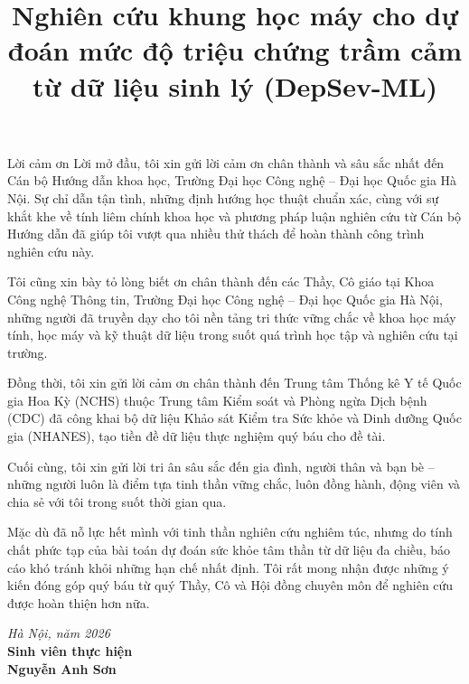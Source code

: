 \documentclass{uetgraduation}
\begin{document}
\title{Nghiên cứu khung học máy cho dự đoán mức độ triệu chứng trầm cảm từ dữ liệu sinh lý (DepSev-ML)}

\makecovers

\pagestyle{plain}

\begin{preamble}{Lời cảm ơn}
Lời mở đầu, tôi xin gửi lời cảm ơn chân thành và sâu sắc nhất đến Cán bộ Hướng dẫn khoa học, Trường Đại học Công nghệ -- Đại học Quốc gia Hà Nội. Sự chỉ dẫn tận tình, những định hướng học thuật chuẩn xác, cùng với sự khắt khe về tính liêm chính khoa học và phương pháp luận nghiên cứu từ Cán bộ Hướng dẫn đã giúp tôi vượt qua nhiều thử thách để hoàn thành công trình nghiên cứu này.

Tôi cũng xin bày tỏ lòng biết ơn chân thành đến các Thầy, Cô giáo tại Khoa Công nghệ Thông tin, Trường Đại học Công nghệ -- Đại học Quốc gia Hà Nội, những người đã truyền dạy cho tôi nền tảng tri thức vững chắc về khoa học máy tính, học máy và kỹ thuật dữ liệu trong suốt quá trình học tập và nghiên cứu tại trường.

Đồng thời, tôi xin gửi lời cảm ơn chân thành đến Trung tâm Thống kê Y tế Quốc gia Hoa Kỳ (NCHS) thuộc Trung tâm Kiểm soát và Phòng ngừa Dịch bệnh (CDC) đã công khai bộ dữ liệu Khảo sát Kiểm tra Sức khỏe và Dinh dưỡng Quốc gia (NHANES), tạo tiền đề dữ liệu thực nghiệm quý báu cho đề tài.

Cuối cùng, tôi xin gửi lời tri ân sâu sắc đến gia đình, người thân và bạn bè -- những người luôn là điểm tựa tinh thần vững chắc, luôn đồng hành, động viên và chia sẻ với tôi trong suốt thời gian qua.

Mặc dù đã nỗ lực hết mình với tinh thần nghiên cứu nghiêm túc, nhưng do tính chất phức tạp của bài toán dự đoán sức khỏe tâm thần từ dữ liệu đa chiều, báo cáo khó tránh khỏi những hạn chế nhất định. Tôi rất mong nhận được những ý kiến đóng góp quý báu từ quý Thầy, Cô và Hội đồng chuyên môn để nghiên cứu được hoàn thiện hơn nữa.

\vspace{1.5cm}
\begin{flushright}
\textit{Hà Nội, năm 2026}\\[0.2cm]
\textbf{Sinh viên thực hiện}\\[1.5cm]
\textbf{Nguyễn Anh Sơn}
\end{flushright}
\end{preamble}
\end{document}
